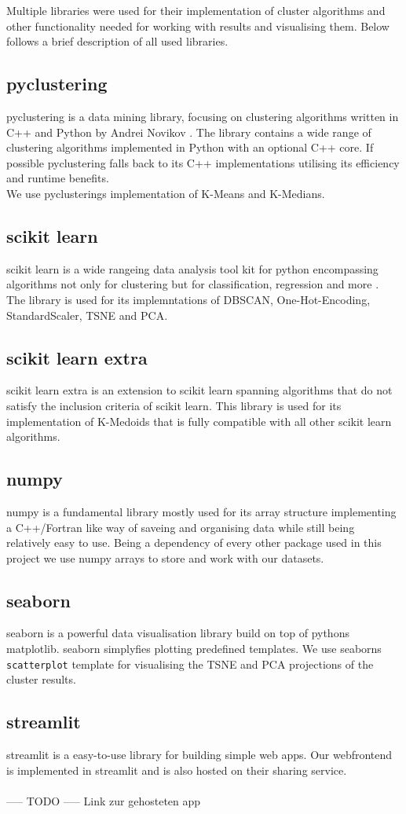 Multiple libraries were used for their implementation of cluster algorithms and other functionality needed for working with results and visualising them. Below follows a brief description of all used libraries.

\subsection{pyclustering}
pyclustering is a data mining library, focusing on clustering algorithms written in C++ and Python by Andrei Novikov \cite{Novikov2019}. The library contains a wide range of clustering algorithms implemented in Python with an optional C++ core. If possible pyclustering falls back to its C++ implementations utilising its efficiency and runtime benefits.\\
We use pyclusterings implementation of K-Means and K-Medians.

\subsection{scikit learn}
scikit learn is a wide rangeing data analysis tool kit for python encompassing algorithms not only for clustering but for classification, regression and more \cite{scikitlearn}.\\
The library is used for its implemntations of DBSCAN, One-Hot-Encoding, StandardScaler, TSNE and PCA.

\subsection{scikit learn extra}
scikit learn extra is an extension to scikit learn spanning algorithms that do not satisfy the inclusion criteria of scikit learn. This library is used for its implementation of K-Medoids that is fully compatible with all other scikit learn algorithms.

\subsection{numpy}
numpy is a fundamental library mostly used for its array structure implementing a C++/Fortran like way of saveing and organising data while still being relatively easy to use. Being a dependency of every other package used in this project we use numpy arrays to store and work with our datasets.

\subsection{seaborn}
seaborn is a powerful data visualisation library build on top of pythons matplotlib. seaborn simplyfies plotting predefined templates. We use seaborns \texttt{scatterplot} template for visualising the TSNE and PCA projections of the cluster results.

\subsection{streamlit}
streamlit is a easy-to-use library for building simple web apps. Our webfrontend is implemented in streamlit and is also hosted on their sharing service.\\
\\
----- TODO ----- Link zur gehosteten app